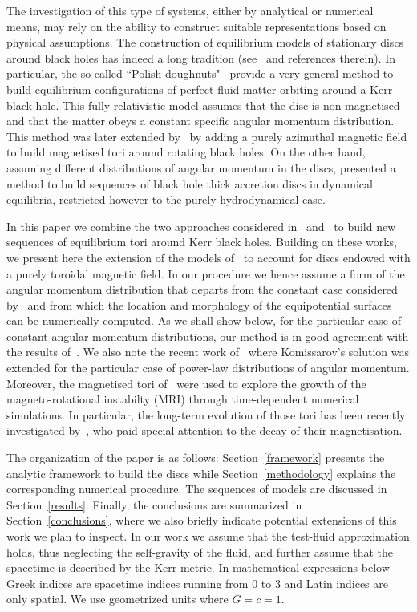 \documentclass[referee]{aa}
\begin{document}
The investigation of this type of systems, either by analytical or numerical means, may rely on the ability to construct suitable 
representations based on physical assumptions. The construction of equilibrium models of stationary discs around black holes has indeed a long tradition (see~\cite{Abramowicz:2013} and references therein). In particular, the so-called ``Polish doughnuts"~\citep{Abramowicz:1978,Kozlowski:1978} provide a  very general method to build equilibrium configurations of perfect fluid matter orbiting around a Kerr black hole. This fully relativistic model assumes that the disc is non-magnetised and that the matter obeys a  constant specific angular momentum distribution. This method was later extended by~\cite{Komissarov:2006}  by adding a purely azimuthal magnetic field to build magnetised tori around rotating black holes. On the other hand, assuming different distributions of angular momentum in the discs, \citet{Qian:2009} presented a method to build sequences of black hole thick accretion discs in dynamical equilibria, restricted however to the purely hydrodynamical case. 
 
 In this paper we combine the two approaches considered in~\cite{Komissarov:2006} and~\citet{Qian:2009} to build new sequences of equilibrium tori around Kerr black holes. Building on these works, we present here the extension of the models of~\citet{Qian:2009} to account for discs endowed with a purely toroidal magnetic field. In our procedure we hence assume a form of the angular momentum distribution that departs from the constant case considered by~\cite{Komissarov:2006} and from which the location and morphology of the equipotential surfaces can be numerically computed. As we shall show below, for the particular case of constant angular momentum distributions, our method is in good agreement with the results of~\citet{Komissarov:2006}. We also note the recent work of~\citet{Wielgus:2015} where Komissarov's solution was extended for the particular case of power-law distributions of angular momentum. Moreover, the magnetised tori of~\citet{Wielgus:2015} were used to explore the growth of the magneto-rotational instabilty (MRI) through time-dependent numerical simulations. In particular, the long-term evolution of those tori has been recently investigated by~\citet{Fragile:2017}, who paid special attention to the decay of their magnetisation. 

The organization of the paper is as follows: Section~\ref{framework} presents the analytic framework to build the discs while Section~\ref{methodology} explains the corresponding numerical procedure. The sequences of models are discussed in Section~\ref{results}. Finally, the conclusions are summarized in Section~\ref{conclusions}, where we also briefly indicate potential extensions of this work we plan to inspect. In our work we assume that the test-fluid approximation holds, thus neglecting the self-gravity of the fluid, and further assume that the spacetime is described by the Kerr metric. In mathematical expressions below Greek indices are spacetime indices running from 0 to 3 and Latin indices are only spatial. We use geometrized units where $G = c = 1$.
\end{document}
